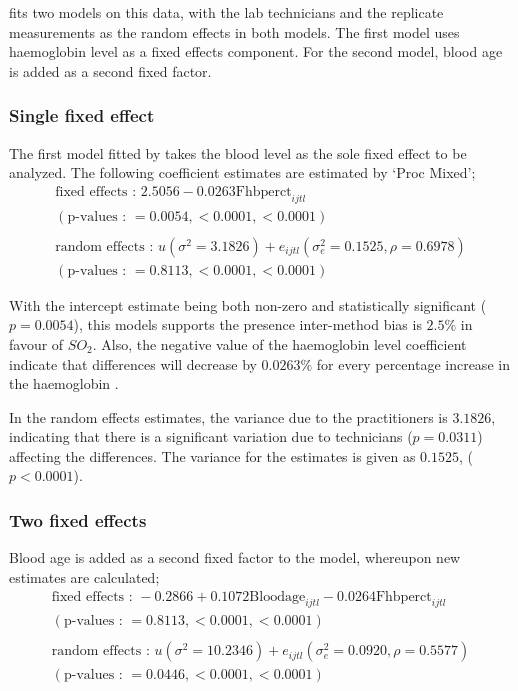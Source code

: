 \documentclass[12pt, a4paper]{report}
\begin{document}
\citet{LaiShiao} fits two models on this data, with the lab
technicians and the replicate measurements as the random effects
in both models. The first model uses haemoglobin level as a fixed
effects component. For the second model, blood age is added as a
second fixed factor.

\subsubsection{Single fixed effect} The first model fitted by \citet{LaiShiao} takes the
blood level as the sole fixed effect to be analyzed. The following
coefficient estimates are estimated by `Proc Mixed';
\begin{eqnarray}
\mbox{fixed effects :   } 2.5056 - 0.0263\mbox{Fhbperct}_{ijtl} \\
(\mbox{p-values :   } = 0.0054, <0.0001, <0.0001)\nonumber\\\nonumber\\
\mbox{random effects :   } u(\sigma^{2}=3.1826) + e_{ijtl}
(\sigma^{2}_{e}=0.1525, \rho= 0.6978) \nonumber\\
(\mbox{p-values :   } = 0.8113, <0.0001, <0.0001)\nonumber
\end{eqnarray}

With the intercept estimate being both non-zero and statistically
significant ($p=0.0054$), this models supports the presence
inter-method bias is $2.5\%$ in favour of $SO_{2}$. Also, the
negative value of the haemoglobin level coefficient indicate that
differences will decrease by $0.0263\%$ for every percentage
increase in the haemoglobin .

In the random effects estimates, the variance due to the
practitioners is $3.1826$, indicating that there is a significant
variation due to technicians ($p=0.0311$) affecting the
differences. The variance for the estimates is given as $0.1525$,
($p<0.0001$).

\subsubsection{Two fixed effects}
Blood age is added as a second fixed factor to the model,
whereupon new estimates are calculated;
\begin{eqnarray}
\mbox{fixed effects :   } -0.2866 + 0.1072 \mbox{Bloodage}_{ijtl}
- 0.0264\mbox{Fhbperct}_{ijtl}\nonumber\\
( \mbox{p-values :   } = 0.8113, <0.0001, <0.0001)\nonumber\\\nonumber\\
\mbox{random effects :   } u(\sigma^{2}=10.2346) + e_{ijtl}
(\sigma^{2}_{e}=0.0920, \rho= 0.5577) \nonumber\\
(\mbox{p-values :   } = 0.0446, <0.0001, <0.0001)
\end{eqnarray}
\end{document}
